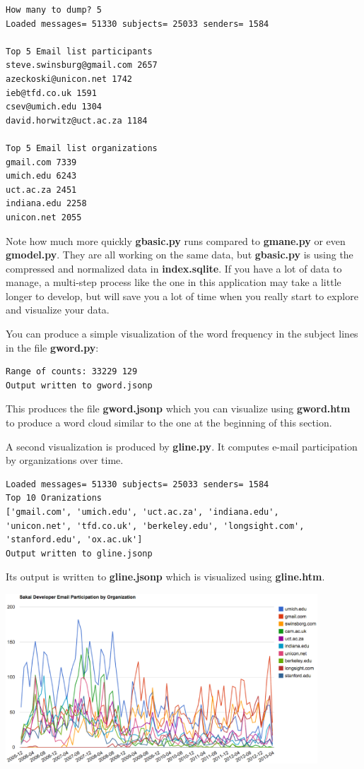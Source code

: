 \documentclass[11pt]{book}
\begin{document}
\beforeverb
\begin{verbatim}
How many to dump? 5
Loaded messages= 51330 subjects= 25033 senders= 1584

Top 5 Email list participants
steve.swinsburg@gmail.com 2657
azeckoski@unicon.net 1742
ieb@tfd.co.uk 1591
csev@umich.edu 1304
david.horwitz@uct.ac.za 1184

Top 5 Email list organizations
gmail.com 7339
umich.edu 6243
uct.ac.za 2451
indiana.edu 2258
unicon.net 2055
\end{verbatim}
\afterverb
%
Note how much more quickly {\bf gbasic.py} runs compared to {\bf gmane.py}
or even {\bf gmodel.py}. They are all working on the same data, but 
{\bf gbasic.py} is using the compressed and normalized data in 
{\bf index.sqlite}.  If you have a lot of data to manage, a multi-step
process like the one in this application may take a little longer to develop,
but will save you a lot of time when you really start to explore
and visualize your data.

You can produce a simple visualization of the word frequency in the subject lines
in the file {\bf gword.py}:

\beforeverb
\begin{verbatim}
Range of counts: 33229 129
Output written to gword.jsonp
\end{verbatim}
\afterverb
%

This produces the file {\bf gword.jsonp} which you can visualize using
{\bf gword.htm} to produce a word cloud similar to the one at the beginning 
of this section.

A second visualization is produced  by {\bf gline.py}.  It computes e-mail 
participation by organizations over time.

\beforeverb
\begin{verbatim}
Loaded messages= 51330 subjects= 25033 senders= 1584
Top 10 Oranizations
['gmail.com', 'umich.edu', 'uct.ac.za', 'indiana.edu', 
'unicon.net', 'tfd.co.uk', 'berkeley.edu', 'longsight.com', 
'stanford.edu', 'ox.ac.uk']
Output written to gline.jsonp
\end{verbatim}
\afterverb
%
Its output is written to {\bf gline.jsonp} which is visualized using {\bf gline.htm}.

\beforefig
\centerline{\includegraphics[height=2.50in]{figs2/mailorg.eps}}
\afterfig
\end{document}
